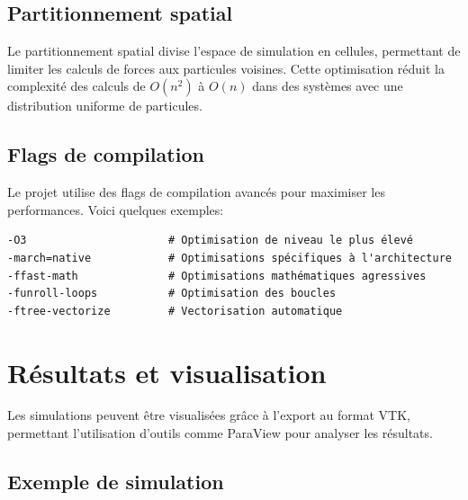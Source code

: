 \documentclass[12pt,a4paper]{article}
\begin{document}
\subsection{Partitionnement spatial}

Le partitionnement spatial divise l'espace de simulation en cellules, permettant de limiter les calculs de forces aux particules voisines. Cette optimisation réduit la complexité des calculs de $O(n^2)$ à $O(n)$ dans des systèmes avec une distribution uniforme de particules.

\subsection{Flags de compilation}

Le projet utilise des flags de compilation avancés pour maximiser les performances. Voici quelques exemples:

\begin{verbatim}
-O3                      # Optimisation de niveau le plus élevé
-march=native            # Optimisations spécifiques à l'architecture
-ffast-math              # Optimisations mathématiques agressives
-funroll-loops           # Optimisation des boucles
-ftree-vectorize         # Vectorisation automatique
\end{verbatim}

\section{Résultats et visualisation}

Les simulations peuvent être visualisées grâce à l'export au format VTK, permettant l'utilisation d'outils comme ParaView pour analyser les résultats.

\subsection{Exemple de simulation}
\end{document}
